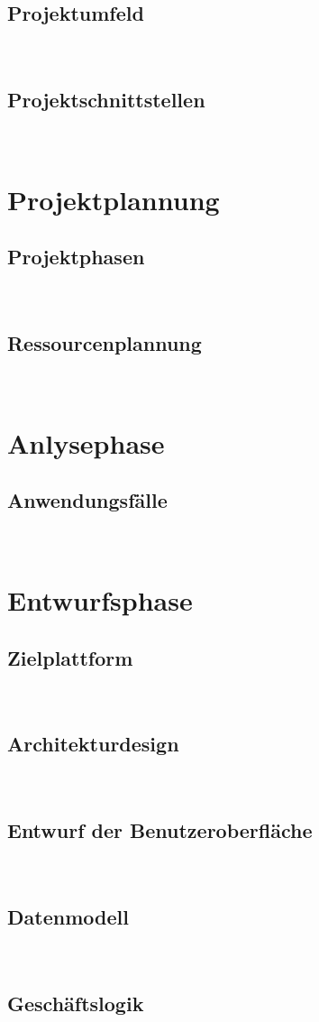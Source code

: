 \documentclass[12pt, a4paper]{article}
\begin{document}
    \subsection{Projektumfeld}
    \lipsum\
    \subsection{Projektschnittstellen}
    \lipsum\
\section{Projektplannung}
    \subsection{Projektphasen}
    \lipsum\
    \subsection{Ressourcenplannung}
    \lipsum\
\section{Anlysephase}
    \subsection{Anwendungsfälle}
    \lipsum\
\section{Entwurfsphase}
    \subsection{Zielplattform}
    \lipsum\
    \subsection{Architekturdesign}
    \lipsum\
    \subsection{Entwurf der Benutzeroberfläche}
    \lipsum\
    \subsection{Datenmodell}
    \lipsum\
    \subsection{Geschäftslogik}
    \lipsum\
\end{document}
